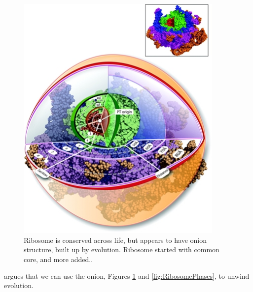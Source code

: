 \documentclass[]{article}
\begin{document}
\begin{figure}[H]
	\caption[Ribosome is conserved across life]{Ribosome is conserved across life, but appears to have onion structure, built up by evolution. Ribosome started with common core, and more added.\cite{hsiao2009peeling}.}\label{fig:Ribosome} 
	\includegraphics[width=0.9\textwidth]{Ribosome}
\end{figure}
\cite{hsiao2009peeling} argues that we can use the onion, Figures \ref{fig:Ribosome} and \ref{fig:RibosomePhases}, to unwind evolution.
\end{document}
